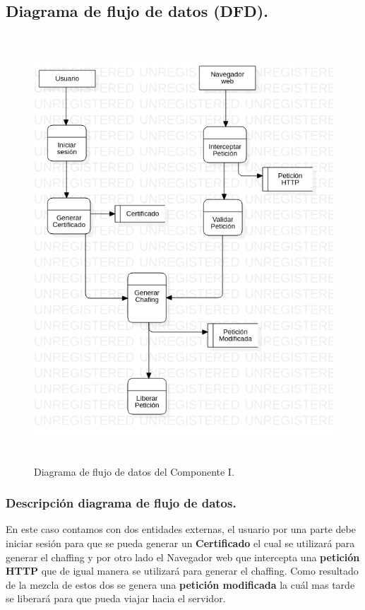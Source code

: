 \documentclass[12pt, a4paper, titlepage]{report}
\begin{document}
			\subsection{Diagrama de flujo de datos (DFD).}
			    \begin{figure}[H]
					\begin{center}			        	    \includegraphics[height=16cm]{./imagenes/Disenio/Componente_1/CI_DFD.png}
						\caption{Diagrama de flujo de datos del Componente I.}
					\end{center}
				\end{figure}
			    
			    \subsubsection{Descripción diagrama de flujo de datos.}
			        En este caso contamos con dos entidades externas, el usuario por una parte debe iniciar sesión para que se pueda generar un \textbf{Certificado} el cual se utilizará para generar el chaffing y por otro lado el Navegador web que intercepta una \textbf{petición HTTP} que de igual manera se utilizará para generar el chaffing. Como resultado de la mezcla de estos dos se genera una \textbf{petición modificada} la cuál mas tarde se liberará para que pueda viajar hacia el servidor.
			   
\end{document}
